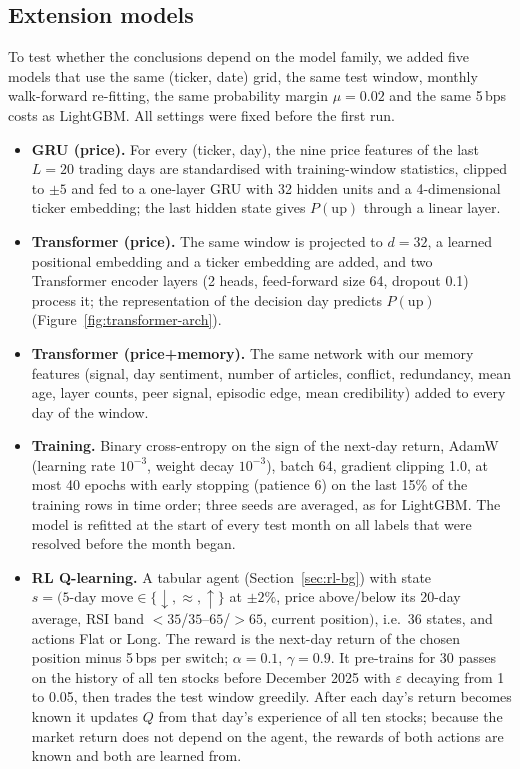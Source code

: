 \subsection{Extension models}
\label{sec:ext-design}
To test whether the conclusions depend on the model family, we added five models that use the same (ticker, date) grid, the same test window, monthly walk-forward re-fitting, the same probability margin $\mu=0.02$ and the same 5\,bps costs as LightGBM. All settings were fixed before the first run.
\begin{itemize}
  \item \textbf{GRU (price).} For every (ticker, day), the nine price features of the last $L=20$ trading days are standardised with training-window statistics, clipped to $\pm5$ and fed to a one-layer GRU with 32 hidden units and a 4-dimensional ticker embedding; the last hidden state gives $P(\text{up})$ through a linear layer.
  \item \textbf{Transformer (price).} The same window is projected to $d=32$, a learned positional embedding and a ticker embedding are added, and two Transformer encoder layers (2 heads, feed-forward size 64, dropout 0.1) process it; the representation of the decision day predicts $P(\text{up})$ (Figure~\ref{fig:transformer-arch}).
  \item \textbf{Transformer (price+memory).} The same network with our memory features (signal, day sentiment, number of articles, conflict, redundancy, mean age, layer counts, peer signal, episodic edge, mean credibility) added to every day of the window.
  \item \textbf{Training.} Binary cross-entropy on the sign of the next-day return, AdamW~\cite{loshchilov2019adamw} (learning rate $10^{-3}$, weight decay $10^{-3}$), batch 64, gradient clipping 1.0, at most 40 epochs with early stopping (patience 6) on the last 15\% of the training rows in time order; three seeds are averaged, as for LightGBM. The model is refitted at the start of every test month on all labels that were resolved before the month began.
  \item \textbf{RL Q-learning.} A tabular agent (Section~\ref{sec:rl-bg}) with state $s=(\text{5-day move}\in\{\downarrow,\approx,\uparrow\}$ at $\pm2\%$, price above/below its 20-day average, RSI band $<35$/$35$--$65$/$>65$, current position$)$, i.e.\ 36 states, and actions Flat or Long. The reward is the next-day return of the chosen position minus 5\,bps per switch; $\alpha=0.1$, $\gamma=0.9$. It pre-trains for 30 passes on the history of all ten stocks before December 2025 with $\varepsilon$ decaying from 1 to 0.05, then trades the test window greedily. After each day's return becomes known it updates $Q$ from that day's experience of all ten stocks; because the market return does not depend on the agent, the rewards of both actions are known and both are learned from.

\end{itemize}
